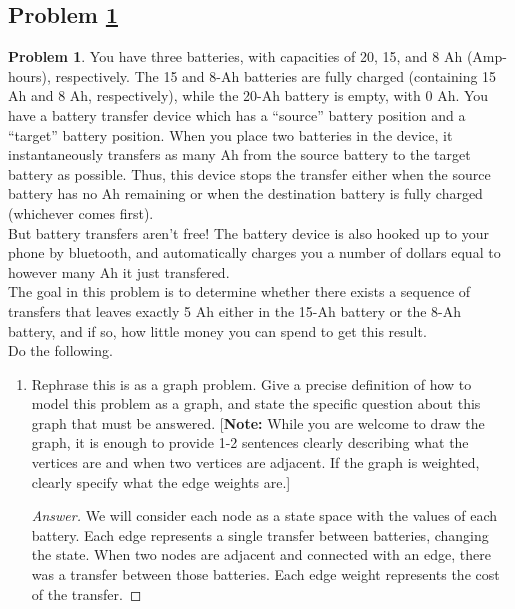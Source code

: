 \documentclass[11pt]{article}
\theoremstyle{definition}
\theoremstyle{definition}
\newtheorem{required}{Problem}
\theoremstyle{definition}
\begin{document}
\subsection{Problem \ref{Dijkstra2}} 
\begin{required} \label{Dijkstra2}
You have three batteries, with capacities of 20, 15, and 8 Ah (Amp-hours), respectively. The 15 and 8-Ah batteries are fully charged (containing 15 Ah and 8 Ah, respectively), while the 20-Ah battery is empty, with 0 Ah. You have a battery transfer device which has a ``source'' battery position and a ``target'' battery position. When you place two batteries in the device, it instantaneously transfers as many Ah from the source battery to the target battery as possible. Thus, this device stops the transfer either when the source battery has no Ah remaining or when the destination battery is fully charged (whichever comes first).  \\

\noindent But battery transfers aren't free! The battery device is also hooked up to your phone by bluetooth, and automatically charges you a number of dollars equal to however many Ah it just transfered.  \\
	
\noindent The goal in this problem is to determine whether there exists a sequence of transfers that leaves exactly 5 Ah either in the 15-Ah battery or the 8-Ah battery, and if so, how little money you can spend to get this result. \\

\noindent Do the following.
\begin{enumerate}[label=(\alph*)]
\subsubsection{Problem 2\ref{Dijkstra2a} (1 point)}
\item \label{Dijkstra2a} Rephrase this is as a graph problem. Give a precise definition of how to model this problem as a graph, and state the specific question about this graph that must be answered. [\textbf{Note:} While you are welcome to draw the graph, it is enough to provide 1-2 sentences clearly describing what the vertices are and when two vertices are adjacent. If the graph is weighted, clearly specify what the edge weights are.]

\begin{proof}[Answer]
We will consider each node as a state space with the values of each battery. Each edge represents a single transfer between batteries, changing the state. When two nodes are adjacent and connected with an edge, there was a transfer between those batteries. Each edge weight represents the cost of the transfer.
\end{proof}


\end{enumerate}
\end{required}
\end{document}

